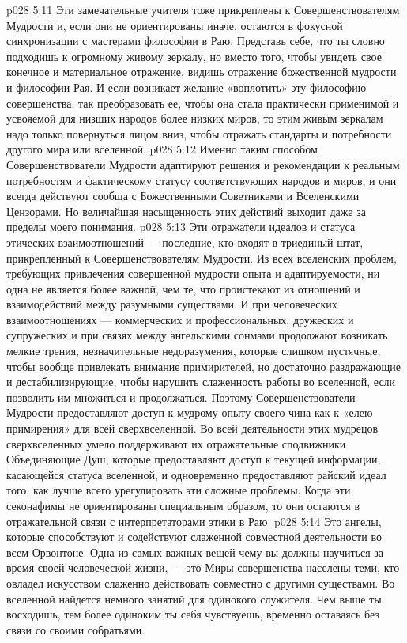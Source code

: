 \vs p028 5:11 \bibnobreakspace {} Эти замечательные учителя тоже прикреплены к Совершенствователям Мудрости и, если они не ориентированы иначе, остаются в фокусной синхронизации с мастерами философии в Раю. Представь себе, что ты словно подходишь к огромному живому зеркалу, но вместо того, чтобы увидеть свое конечное и материальное отражение, видишь отражение божественной мудрости и философии Рая. И если возникает желание «воплотить» эту философию совершенства, так преобразовать ее, чтобы она стала практически применимой и усвояемой для низших народов более низких миров, то этим живым зеркалам надо только повернуться лицом вниз, чтобы отражать стандарты и потребности другого мира или вселенной.
\vs p028 5:12 Именно таким способом Совершенствователи Мудрости адаптируют решения и рекомендации к реальным потребностям и фактическому статусу соответствующих народов и миров, и они всегда действуют сообща с Божественными Советниками и Вселенскими Цензорами. Но величайшая насыщенность этих действий выходит даже за пределы моего понимания.
\vs p028 5:13 \bibnobreakspace {} Эти отражатели идеалов и статуса этических взаимоотношений --- последние, кто входят в триединый штат, прикрепленный к Совершенствователям Мудрости. Из всех вселенских проблем, требующих привлечения совершенной мудрости опыта и адаптируемости, ни одна не является более важной, чем те, что проистекают из отношений и взаимодействий между разумными существами. И при человеческих взаимоотношениях --- коммерческих и профессиональных, дружеских и супружеских и при связях между ангельскими сонмами продолжают возникать мелкие трения, незначительные недоразумения, которые слишком пустячные, чтобы вообще привлекать внимание примирителей, но достаточно раздражающие и дестабилизирующие, чтобы нарушить слаженность работы во вселенной, если позволить им множиться и продолжаться. Поэтому Совершенствователи Мудрости предоставляют доступ к мудрому опыту своего чина как к «елею примирения» для всей сверхвселенной. Во всей деятельности этих мудрецов сверхвселенных умело поддерживают их отражательные сподвижники Объединяющие Душ, которые предоставляют доступ к текущей информации, касающейся статуса вселенной, и одновременно предоставляют райский идеал того, как лучше всего урегулировать эти сложные проблемы. Когда эти секонафимы не ориентированы специальным образом, то они остаются в отражательной связи с интерпретаторами этики в Раю.
\vs p028 5:14 \pc Это ангелы, которые способствуют и содействуют слаженной совместной деятельности во всем Орвонтоне. Одна из самых важных вещей чему вы должны научиться за время своей человеческой жизни, --- это  Миры совершенства населены теми, кто овладел искусством слаженно действовать совместно с другими существами. Во вселенной найдется немного занятий для одинокого служителя. Чем выше ты восходишь, тем более одиноким ты себя чувствуешь, временно оставаясь без связи со своими собратьями.
